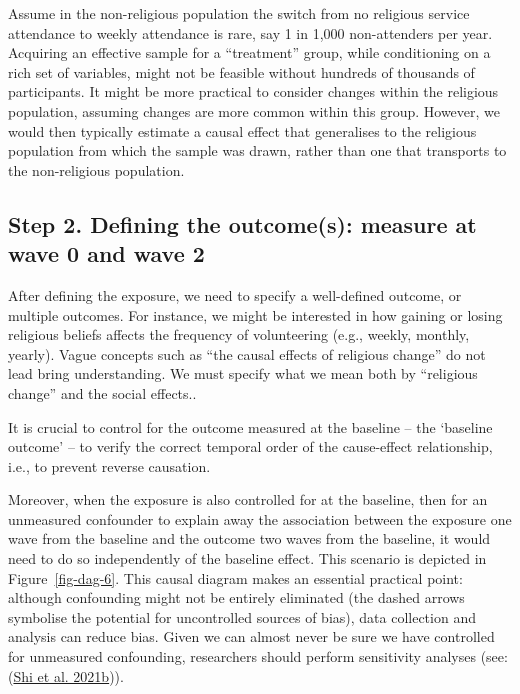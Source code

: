 \documentclass[
  singlecolumn]{report}
\begin{document}
Assume in the non-religious population the switch from no religious
service attendance to weekly attendance is rare, say 1 in 1,000
non-attenders per year. Acquiring an effective sample for a
``treatment'' group, while conditioning on a rich set of variables,
might not be feasible without hundreds of thousands of participants. It
might be more practical to consider changes within the religious
population, assuming changes are more common within this group. However,
we would then typically estimate a causal effect that generalises to the
religious population from which the sample was drawn, rather than one
that transports to the non-religious population.

\hypertarget{step-2.-defining-the-outcomes-measure-at-wave-0-and-wave-2}{%
\subsection{Step 2. Defining the outcome(s): measure at wave 0 and wave
2}\label{step-2.-defining-the-outcomes-measure-at-wave-0-and-wave-2}}

After defining the exposure, we need to specify a well-defined outcome,
or multiple outcomes. For instance, we might be interested in how
gaining or losing religious beliefs affects the frequency of
volunteering (e.g., weekly, monthly, yearly). Vague concepts such as
``the causal effects of religious change'' do not lead bring
understanding. We must specify what we mean both by ``religious change''
and the social effects..

It is crucial to control for the outcome measured at the baseline -- the
`baseline outcome' -- to verify the correct temporal order of the
cause-effect relationship, i.e., to prevent reverse causation.

Moreover, when the exposure is also controlled for at the baseline, then
for an unmeasured confounder to explain away the association between the
exposure one wave from the baseline and the outcome two waves from the
baseline, it would need to do so independently of the baseline effect.
This scenario is depicted in Figure~\ref{fig-dag-6}. This causal diagram
makes an essential practical point: although confounding might not be
entirely eliminated (the dashed arrows symbolise the potential for
uncontrolled sources of bias), data collection and analysis can reduce
bias. Given we can almost never be sure we have controlled for
unmeasured confounding, researchers should perform sensitivity analyses
(see: (\protect\hyperlink{ref-shi2021c}{Shi et al. 2021b})).
\end{document}
